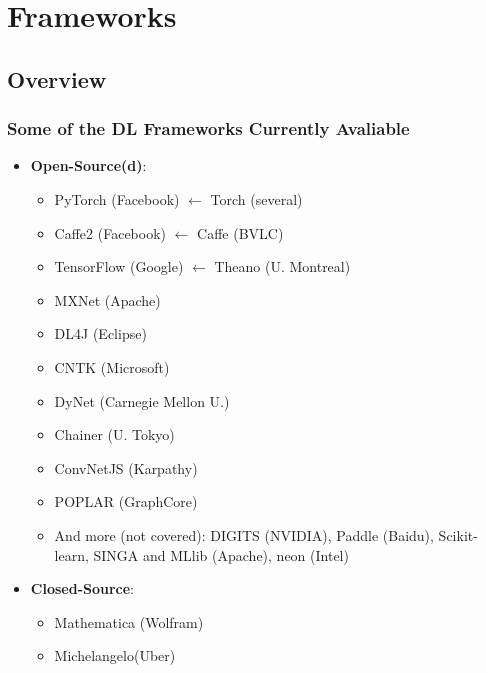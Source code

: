 \documentclass[hyperref={pdfpagelabels=false}]{beamer}
\begin{document}
     
     \section{Frameworks}
     \frame{\sectionpage}

     \subsection{Overview} %
     \begin{frame}
       \frametitle{Some of the DL Frameworks Currently Avaliable}
       \begin{itemize}[<.->]

       \item  \textbf{Open-Source(d)}:
         \begin{itemize}[<.->]
         \item PyTorch (Facebook) $\leftarrow$ \textcolor{visiblered}{Torch (several)}
         \item Caffe2 (Facebook) $\leftarrow$ \textcolor{visiblered}{Caffe (BVLC)}
         \item TensorFlow (Google) $\leftarrow$ \textcolor{visiblered}{Theano (U. Montreal)}
         \item \small{MXNet (Apache)}
         \item \small{DL4J (Eclipse)}
         \item \small{CNTK (Microsoft)}
         \item \small{\textcolor{visiblered}{DyNet (Carnegie Mellon U.)}}
         \item \small{\textcolor{visiblered}{Chainer (U. Tokyo)}}
         \item \small{\textcolor{visiblered}{ConvNetJS (Karpathy)}}
         \item \small{POPLAR (GraphCore)}
         \item \small{And more (not covered): DIGITS (NVIDIA), Paddle (Baidu), Scikit-learn, SINGA and MLlib (Apache), neon (Intel)}
         \end{itemize}
       \end{itemize}
       \vspace{-2mm}

       \begin{minipage}[t]{0.45\textwidth}
         \vspace{0pt}
         \begin{itemize}[<.->]
           \item  \textbf{Closed-Source}:
             \begin{itemize}[<.->]
             \item \small{\textcolor{visiblered}{Mathematica (Wolfram)}}
             \item \small{Michelangelo(Uber)}
             \end{itemize}
           \end{itemize}



\end{minipage}
\end{frame}
\end{document}
